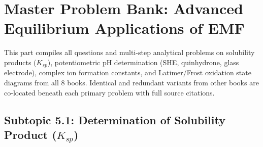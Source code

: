 \chapter{Master Problem Bank: Advanced Equilibrium Applications of EMF}
\label{chap:qb_equilibrium}

\begin{tcolorbox}[enhanced,colback=subtlegreen,colframe=cengagegreen,arc=2mm,boxrule=1pt,
    title=\textbf{\large Part V Organization: Equilibrium Applications, pH, $K_{sp}$, Latimer \& Frost}]
This part compiles all questions and multi-step analytical problems on solubility products ($K_{sp}$), potentiometric pH determination (SHE, quinhydrone, glass electrode), complex ion formation constants, and Latimer/Frost oxidation state diagrams from all 8 books. Identical and redundant variants from other books are co-located beneath each primary problem with full source citations.
\end{tcolorbox}

\section{Subtopic 5.1: Determination of Solubility Product ($K_{sp}$)}


